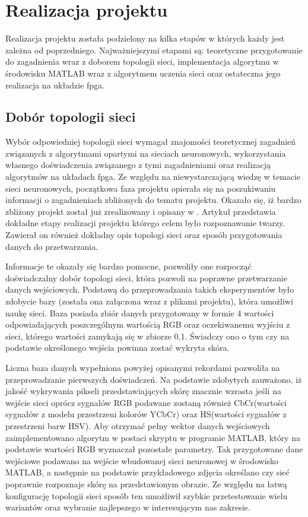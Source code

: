 \chapter{Realizacja projektu}
\label{cha:realizacja}

Realizacja projektu została podzielony na kilka etapów w których każdy jest zależna od  poprzedniego. Najważniejszymi etapami są: teoretyczne przygotowanie do zagadnienia wraz z doborem topologii sieci, implementacja algorytmu w środowisku MATLAB wraz z algorytmem uczenia sieci oraz ostateczna jego realizacja na układzie fpga. 
\section{Dobór topologii sieci}

Wybór odpowiedniej topologii sieci wymagał znajomości teoretycznej zagadnień związanych z algorytmami opartymi na sieciach neuronowych, wykorzystania własnego doświadczenia związanego z tymi zagadnieniami oraz realizacją algorytmów na układach fpga. Ze względu na niewystarczającą wiedzę w temacie sieci neuronowych, początkowa faza projektu opierała się na poszukiwaniu informacji o zagadnieniach zbliżonych do tematu projektu. Okazało się, iż bardzo zbliżony projekt został już zrealizowany i opisany w \cite{fdciuss}. Artykuł przedstawia dokładne etapy realizacji projektu którego celem było rozpoznawanie twarzy. Zawierał on również dokładny opis topologi sieci oraz sposób przygotowania danych do przetwarzania. 

Informacje te okazały się bardzo pomocne, pozwoliły one rozpocząć doświadczalny dobór topologi sieci, która pozwoli na poprawne przetwarzanie danych wejściowych. 
Podstawą do przeprowadzania takich eksperymentów było zdobycie bazy (została ona załączona wraz z plikami projektu), która umożliwi naukę sieci. Baza posiada zbiór danych przygotowany w formie 4 wartości odpowiadających poszczególnym wartością RGB oraz oczekiwanemu wyjściu z sieci, którego wartości zamykają się w zbiorze {0,1}. Świadczy ono o tym czy na podstawie określonego wejścia powinna zostać wykryta skóra.

Liczna baza danych wypełniona powyżej opisanymi rekordami pozwoliła na przeprowadzanie pierwszych doświadczeń. Na podstawie zdobytych zauważono, iż jakość wykrywania pikseli przedstawiających skórę znacznie wzrasta jeśli na wejście sieci oprócz sygnałów RGB podawane zostaną również CbCr(wartości sygnałów z modelu przestrzeni kolorów YCbCr) oraz HS(wartości sygnałów z przestrzeni barw HSV). Aby otrzymać pełny wektor danych wejściowych zaimplementowano algorytm w postaci skryptu w programie MATLAB, który na podstawie wartości RGB wyznaczał pozostałe parametry. Tak przygotowane dane wejściowe podawano na wejście wbudowanej sieci neuronowej w środowisko MATLAB, a następnie na podstawie przykładowego zdjęcia określano czy sieć poprawnie rozpoznaje skórę na przedstawionym obrazie. Ze względu na łatwą konfigurację topologii sieci sposób ten umożliwił szybkie przetestowanie wielu wariantów oraz wybranie najlepszego w interesującym nas zakresie.


